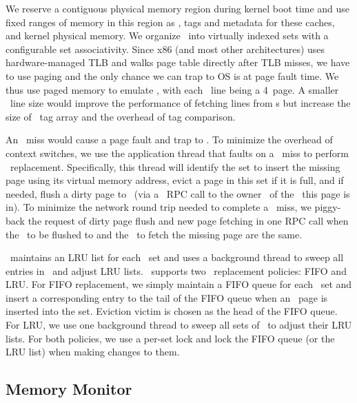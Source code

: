\documentclass[10pt,times,twocolumn]{z2-article}
\begin{document}
{{{{{{{%
We reserve a contiguous physical memory region during kernel boot time
and use fixed ranges of memory in this region as \excache, tags and metadata for these caches, and kernel physical memory. 
We organize \excache\ into virtually indexed sets with a configurable set associativity.
Since x86 (and most other architectures) uses hardware-managed TLB and walks page table directly after TLB misses, 
we have to use paging and the only chance we can trap to OS is at page fault time. 
We thus use paged memory to emulate \excache, 
with each \excache\ line being a 4\KB\ page.
A smaller \excache\ line size would improve the performance of fetching lines from \mcomponent{}s
but increase the size of \excache\ tag array and the overhead of tag comparison. 

An \excache\ miss would cause a page fault and trap to \lego.
To minimize the overhead of context switches,
we use the application thread that faults on a \excache\ miss
to perform \excache\ replacement.
Specifically, this thread will identify the set to insert the missing page
using its virtual memory address,
evict a page in this set if it is full,
and if needed, flush a dirty page to \mcomponent\ 
(via a \lego\ RPC call to the owner \mcomponent\ of the \vregion\ this page is in).
To minimize the network round trip needed to complete a \excache\ miss,
we piggy-back the request of dirty page flush and new page fetching
in one RPC call when the \mcomponent\ to be flushed to and the \mcomponent\ to fetch the missing page are the same.

\lego\ maintains an LRU list for each \excache\ set 
and uses a background thread to sweep all entries in \excache\ and adjust LRU lists.
\lego\ supports two \excache\ replacement policies:
FIFO and LRU. For FIFO replacement, we simply maintain a FIFO queue for each \excache\ set and insert a
corresponding entry to the tail of the FIFO queue when
an \excache\ page is inserted into the set. Eviction victim is chosen as the head of the FIFO queue. 
For LRU, we use one background thread to sweep all sets of \excache\ to adjust their LRU lists.
For both policies, we use a per-set lock and lock the FIFO queue (or the LRU list) when
making changes to them.

\subsection{Memory Monitor}
\label{sec:memimpl}

}}}}}}}
\end{document}
